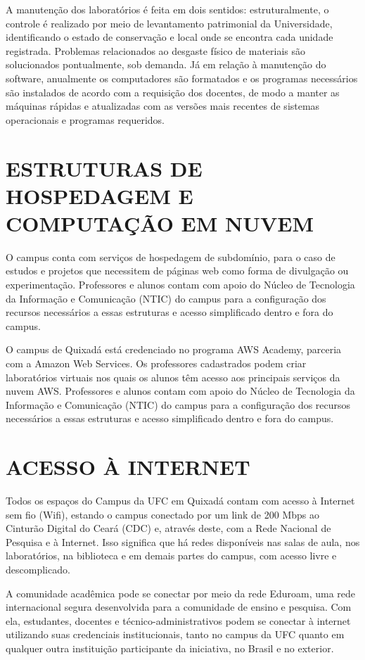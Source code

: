 A manutenção dos laboratórios é feita em dois sentidos: estruturalmente, o controle é realizado por meio de levantamento patrimonial da Universidade, identificando o estado de conservação e local onde se encontra cada unidade registrada. Problemas relacionados ao desgaste físico de materiais são solucionados pontualmente, sob demanda. Já em relação à manutenção do software, anualmente os computadores são formatados e os programas necessários são instalados de acordo com a requisição dos docentes, de modo a manter as máquinas rápidas e atualizadas com as versões mais recentes de sistemas operacionais e programas requeridos.

\section{ESTRUTURAS DE HOSPEDAGEM E COMPUTAÇÃO EM NUVEM}

O campus conta com serviços de hospedagem de subdomínio, para o caso de estudos e projetos que necessitem de páginas web como forma de divulgação ou experimentação. Professores e alunos contam com apoio do Núcleo de Tecnologia da Informação e Comunicação (NTIC) do campus para a configuração dos recursos necessários a essas estruturas e acesso simplificado dentro e fora do campus.

O campus de Quixadá está credenciado no programa AWS Academy, parceria com a Amazon Web Services. Os professores cadastrados podem criar laboratórios virtuais nos quais os alunos têm acesso aos principais serviços da nuvem AWS. Professores e alunos contam com apoio do Núcleo de Tecnologia da Informação e Comunicação (NTIC) do campus para a configuração dos recursos necessários a essas estruturas e acesso simplificado dentro e fora do campus.

\section{ACESSO À INTERNET}

Todos os espaços do Campus da UFC em Quixadá contam com acesso à Internet sem fio (Wifi), estando o campus conectado por um link de 200 Mbps ao Cinturão Digital do Ceará (CDC) e, através deste, com a Rede Nacional de Pesquisa e à Internet. Isso significa que há redes disponíveis nas salas de aula, nos laboratórios, na biblioteca e em demais partes do campus, com acesso livre e descomplicado.

A comunidade acadêmica pode se conectar por meio da rede Eduroam, uma rede internacional segura desenvolvida para a comunidade de ensino e pesquisa. Com ela, estudantes, docentes e técnico-administrativos podem se conectar à internet utilizando suas credenciais institucionais, tanto no campus da UFC quanto em qualquer outra instituição participante da iniciativa, no Brasil e no exterior.

